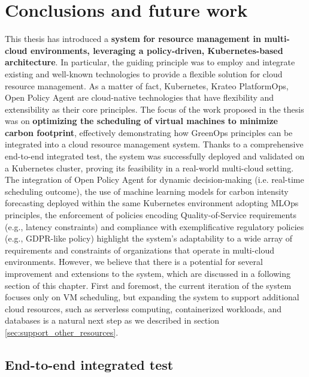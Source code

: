 \chapter{Conclusions and future work}
\label{cha:conclusion}

This thesis has introduced a \textbf{system for resource management in multi-cloud environments, leveraging a policy-driven, Kubernetes-based architecture}. 
In particular, the guiding principle was to employ and integrate existing and well-known technologies to provide a flexible solution for cloud resource management.
As a matter of fact, Kubernetes, Krateo PlatformOps, Open Policy Agent are cloud-native technologies that have flexibility and extensibility as their core principles.
The focus of the work proposed in the thesis was on \textbf{optimizing the scheduling of virtual machines to minimize carbon footprint}, effectively demonstrating how GreenOps principles can be integrated into a cloud resource management system.
Thanks to a comprehensive end-to-end integrated test, the system was successfully deployed and validated on a Kubernetes cluster, proving its feasibility in a real-world multi-cloud setting.
The integration of Open Policy Agent for dynamic decision-making (i.e. real-time scheduling outcome), the use of machine learning models for carbon intensity forecasting deployed within the same Kubernetes environment adopting MLOps principles, the enforcement of policies encoding Quality-of-Service requirements (e.g., latency constraints) and compliance with exemplificative regulatory policies (e.g., GDPR-like policy) highlight the system’s adaptability to a wide array of requirements and constraints of organizations that operate in multi-cloud environments.
However, we believe that there is a potential for several improvement and extensions to the system, which are discussed in a following section of this chapter.
First and foremost, the current iteration of the system focuses only on VM scheduling, but expanding the system to support additional cloud resources, such as serverless computing, containerized workloads, and databases is a natural next step as we described in section \ref{sec:support_other_resources}.

\section{End-to-end integrated test}

